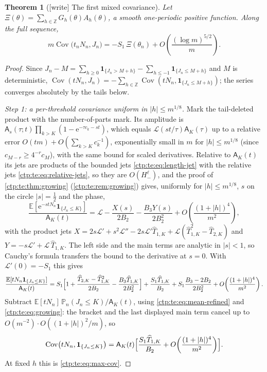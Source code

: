 \documentclass[11pt,a4paper]{article}
\numberwithin{equation}{section}
\newtheorem{theorem}{Theorem}[section]
\theoremstyle{definition}
\theoremstyle{remark}
\newcommand{\Z}{\mathbb Z}
\newcommand{\e}{\mathrm e}
\newcommand{\PP}{\mathbb P}
\newcommand{\E}{\mathbb E}
\DeclareMathOperator{\Cov}{Cov}
\newcommand{\ind}{\mathbf 1}
\newcommand{\LW}{\mathcal L}
\newcommand{\amp}{\mathsf A}
\begin{document}
\begin{theorem}[{[write]} The first mixed covariance]\label{ctp:cl:thm:mixedcov}
Let $\Xi(\theta)=\sum_{h\in\Z}G_h(\theta)A_h(\theta)$, a smooth one-periodic
positive function. Along the full sequence,
\begin{equation}\label{ctp:cl:eq:mixedcov}
 m\Cov\bigl(t_nN_n,J_n\bigr)=-S_1\,\Xi(\theta_n)+O\!\left(\frac{(\log m)^{5/2}}m\right).
\end{equation}
\end{theorem}
\begin{proof}
Since $J_n-M=\sum_{h\ge0}\ind_{\{J_n>M+h\}}-\sum_{h\le-1}\ind_{\{J_n\le M+h\}}$
and $M$ is deterministic,
$\Cov(tN_n,J_n)=-\sum_{h\in\Z}\Cov(tN_n,\ind_{\{J_n\le M+h\}})$; the series
converges absolutely by the tails below.

\emph{Step 1: a per-threshold covariance uniform in $|h|\le m^{1/8}$.} Mark
the tail-deleted product with the number-of-parts mark. Its amplitude is
$\amp_s(\tau;t)\prod_{k>K}(1-\e^{-\tau c_k-st})$, which equals
$\LW(st/\tau)\amp_K(\tau)$ up to a relative error
$O(tm)+O(\sum_{k>K}c_k^{-1})$, exponentially small in $m$ for
$|h|\le m^{1/8}$ (since $c_{M-r}\ge4^{-r}c_M$), with the same bound for
scaled derivatives. Relative to $\amp_K(t)$ its jets are products of the bounded
jets \eqref{ctp:te:eq:length-jet} with the relative jets
\eqref{ctp:te:eq:relative-jets}, so they are $O(H_-^\ell)$, and the proof of
\cref{ctp:te:thm:growing} (\cref{ctp:te:rem:growing}) gives, uniformly for
$|h|\le m^{1/8}$, $s$ on the circle $|s|=\tfrac12$ and the phase,
\[
 \frac{\E[\e^{-stN_n}\ind_{\{J_n\le K\}}]}{\amp_K(t)}=\LW-\frac{X(s)}{2B_2}
 -\frac{B_3Y(s)}{2B_2^2}+O\!\left(\frac{(1+|h|)^4}{m^2}\right),
\]
with the product jets
$X=2s\LW'+s^2\LW''-2s\LW'\widehat T_{1,K}+\LW(\widehat T_{1,K}^2-\widehat T_{2,K})$
and $Y=-s\LW'+\LW\,\widehat T_{1,K}$. The left side and the main terms are
analytic in $|s|<1$, so Cauchy's formula transfers the bound to the
derivative at $s=0$. With $\LW'(0)=-S_1$ this gives
\[
 \frac{\E[tN_n\ind_{\{J_n\le K\}}]}{\amp_K(t)}=S_1\Bigl[1+\frac{\widehat T_{2,K}-\widehat T_{1,K}^2}{2B_2}
 -\frac{B_3\widehat T_{1,K}}{2B_2^2}\Bigr]+\frac{S_1\widehat T_{1,K}}{B_2}
 +S_1\frac{B_3-2B_2}{2B_2^2}+O\!\left(\frac{(1+|h|)^4}{m^2}\right).
\]
Subtract $\E[tN_n]\,\PP_n(J_n\le K)/\amp_K(t)$, using
\eqref{ctp:te:eq:mean-refined} and \eqref{ctp:te:eq:growing}: the bracket
and the last displayed main term cancel up to
$O(m^{-2})\cdot O((1+|h|)^2/m)$, so
\[
 \Cov\bigl(tN_n,\ind_{\{J_n\le K\}}\bigr)=\amp_K(t)\Bigl[\frac{S_1\widehat T_{1,K}}{B_2}
 +O\!\left(\frac{(1+|h|)^4}{m^2}\right)\Bigr].
\]
At fixed $h$ this is \eqref{ctp:te:eq:max-cov}.


\end{proof}
\end{document}
